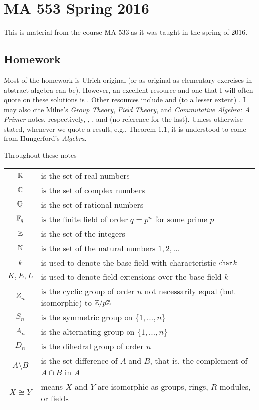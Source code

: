 \section{MA 553 Spring 2016}
This is material from the course MA 533 as it was taught in the spring of
2016.%
\bigskip
\subsection{Homework}
Most of the homework is Ulrich original (or as original as elementary
exercises in abstract algebra can be). However, an excellent resource and
one that I will often quote on these solutions is \cite{hungerford}. Other
resources include \cite{dummit-foote} and (to a lesser extent)
\cite{herstein}. I may also cite Milne's \emph{Group Theory}, \emph{Field
  Theory}, and \emph{Commutative Algebra: A Primer} notes, respectively,
\cite{milneGT}, \cite{milneFT}, and (no reference for the last). Unless
otherwise stated, whenever we quote a result, e.g., Theorem 1.1, it is
understood to come from Hungerford's \emph{Algebra}.

Throughout these notes

\begin{tabular}{cl}
  \(\mathbb{R}\)   & is the set of real numbers\\
  \(\mathbb{C}\)   & is the set of complex numbers\\
  \(\mathbb{Q}\)   & is the set of rational numbers\\
  \(\mathbb{F}_q\) & is the finite field of order \(q=p^n\) for some prime \(p\)\\
  \(\mathbb{Z}\)   & is the set of the integers\\
  \(\mathbb{N}\)   & is the set of the natural numbers \(1,2,\dotsc\)\\
  \(k\)   & is used to denote the base field with
            characteristic \(\operatorname{char} k\)\\
  \(K,E,L\)& is used to denote field extensions over the base field
             \(k\)\\
  \(Z_n\)    & is the cyclic group of order \(n\) not necessarily equal
               (but isomorphic) to \(\mathbb{Z}/p\mathbb{Z}\)\\
  \(S_n\)    & is the symmetric group on \(\{1,\dotsc,n\}\)\\
  \(A_n\)    & is the alternating group on \(\{1,\dotsc,n\}\)\\
  \(D_n\)    & is the dihedral group of order \(n\)\\
  \(A\setminus B\) & is the set difference of \(A\) and \(B\), that is, the
                     complement of \(A\cap B\) in \(A\)\\
  \(X\cong Y\) & means \(X\) and \(Y\) are isomorphic as groups, rings,
                 \(R\)-modules, or fields
\end{tabular}

